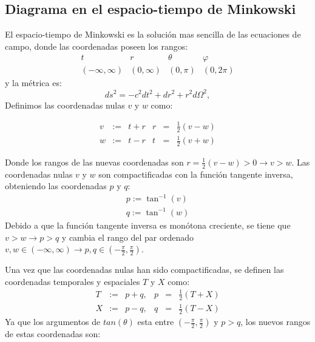 \subsection{Diagrama en el espacio-tiempo de Minkowski}
El espacio-tiempo de Minkowski es la solución mas sencilla de las ecuaciones de campo, donde las coordenadas poseen los rangos:
\begin{equation}
  \begin{array}{c|c|c|c}
    t                  & r           & \theta   & \varphi   \\
    ( -\infty, \infty) & (0, \infty) & (0, \pi) & (0, 2\pi)
  \end{array}
\end{equation}
y la métrica es:
\begin{equation}
  ds^2 = -c^2dt^2 + dr^2 + r^2 d\Omega^2,
\end{equation}
Definimos las coordenadas nulas $v$ y $w$ como:

\begin{equation}
  \begin{array}{rcl|rcl}
    v & := & t+r & r & = & \frac{1}{2}(v-w) \\
    w & := & t-r & t & = & \frac{1}{2}(v+w)
  \end{array}
\end{equation}

Donde los rangos de las nuevas coordenadas son  $r=\frac{1}{2}(v-w)>0 \longrightarrow v>w$.
Las coordenadas nulas $v$ y $w$ son compactificadas con la función tangente inversa, obteniendo las coordenadas $p$ y $q$:
\begin{equation}
  \begin{aligned}
    p:=\tan ^{-1}(v) \\
    q :=\tan ^{-1}(w)
  \end{aligned}
\end{equation}
Debido a que la función tangente inversa es monótona creciente, se tiene que $v>w \longrightarrow p>q$ y cambia el rango del par ordenado $v,w \in (-\infty, \infty) \longrightarrow p,q \in \left(-\frac{\pi}{2}, \frac{\pi}{2}\right)$.

Una vez que las coordenadas nulas han sido compactificadas, se definen las coordenadas temporales y espaciales $T$ y $X$ como:
\begin{equation}
  \begin{array}{rcl|rcl}
    T & := & p + q, & p & = & \tfrac{1}{2}(T + X) \\[4pt]
    X & := & p - q, & q & = & \tfrac{1}{2}(T - X)
  \end{array}
\end{equation}
Ya que los argumentos de $tan(\theta)$ esta entre $(-\frac{\pi}{2}, \frac{\pi}{2})$ y $p>q$, los nuevos rangos de estas coordenadas son:

